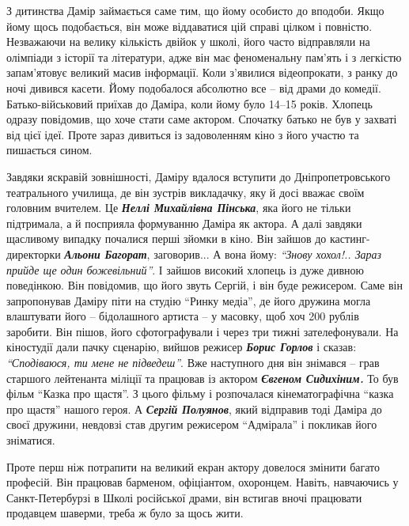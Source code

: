 
З дитинства Дамір займається саме тим, що йому особисто до вподоби. Якщо йому
щось подобається, він може віддаватися цій справі цілком і повністю. Незважаючи
на велику кількість двійок у школі, його часто відправляли на олімпіади з
історії та літератури, адже він має феноменальну пам'ять і з легкістю
запам'ятовує великий масив інформації. Коли з'явилися відеопрокати, з ранку до
ночі дивився касети. Йому подобалося абсолютно все – від драми до комедії.
Батько-військовий приїхав до Даміра, коли йому було 14–15 років. Хлопець одразу
повідомив, що хоче стати саме актором. Спочатку батько не був у захваті від
цієї ідеї. Проте зараз дивиться із задоволенням кіно з його участю та пишається
сином.


Завдяки яскравій зовнішності, Даміру вдалося вступити до Дніпропетровського
театрального училища, де він зустрів викладачку, яку й досі вважає своїм
головним вчителем. Це \emph{\textbf{Неллі Михайлівна Пінська}}, яка його не тільки підтримала,
а й посприяла формуванню Даміра як актора. А далі завдяки щасливому випадку
почалися перші зйомки в кіно. Він зайшов до кастинг-директорки \emph{\textbf{Альони Багорат}},
заговорив... А вона йому: \emph{\enquote{Знову хохол!.. Зараз прийде ще один божевільний}}. І
зайшов високий хлопець із дуже дивною поведінкою. Він повідомив, що його звуть
Сергій, і він буде режисером. Саме він запропонував Даміру піти на студію
\enquote{Ринку медіа}, де його дружина могла влаштувати його – бідолашного артиста – у
масовку, щоб хоч 200 рублів заробити. Він пішов, його сфотографували і через
три тижні зателефонували. На кіностудії дали пачку сценарію, вийшов режисер
\emph{\textbf{Борис Горлов}} і сказав: \emph{\enquote{Сподіваюся, ти мене не підведеш}}. Вже наступного дня
він знімався – грав старшого лейтенанта міліції та працював із актором \emph{\textbf{Євгеном
Сидихіним.}} То був фільм \enquote{Казка про щастя}. З цього фільму і розпочалася
кінематографічна \enquote{казка про щастя} нашого героя. А \emph{\textbf{Сергій Полуянов}}, який
відправив тоді Даміра до своєї дружини, невдовзі став другим режисером
\enquote{Адмірала} і покликав його зніматися.


Проте перш ніж потрапити на великий екран актору довелося змінити багато
професій. Він працював барменом, офіціантом, охоронцем. Навіть, навчаючись у
Санкт-Петербурзі в Школі російської драми, він встигав вночі працювати
продавцем шаверми, треба ж було за щось жити.

